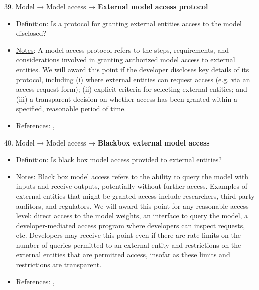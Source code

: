 39. Model → Model access → \textbf{External model access protocol}
\vspace{-\parskip}
\begin{itemize}
	\item
	\underline{Definition}: Is a protocol for granting external entities access to the model disclosed?
	\item
	\underline{Notes}: A model access protocol refers to the steps, requirements, and considerations involved in granting authorized model access to external entities. We will award this point if the developer discloses key details of its protocol, including (i) where external entities can request access (e.g. via an access request form); (ii) explicit criteria for selecting external entities; and (iii) a transparent decision on whether access has been granted within a specified, reasonable period of time.
	\item
	\underline{References}: \citet{solaiman2023gradient}, \citet{shevlane2022structured}
\end{itemize} \vspace{\baselineskip}


40. Model → Model access → \textbf{Blackbox external model access}
\vspace{-\parskip}
\begin{itemize}
	\item
	\underline{Definition}: Is black box model access provided to external entities?
	\item
	\underline{Notes}: Black box model access refers to the ability to query the model with inputs and receive outputs, potentially without further access. Examples of external entities that might be granted access include researchers, third-party auditors, and regulators. We will award this point for any reasonable access level: direct access to the model weights, an interface to query the model, a developer-mediated access program where developers can inspect requests, etc. Developers may receive this point even if there are rate-limits on the number of queries permitted to an external entity and restrictions on the external entities that are permitted access, insofar as these limits and restrictions are transparent.
	\item
	\underline{References}: \citet{solaiman2023gradient}, \citet{shevlane2022structured}
\end{itemize} \vspace{\baselineskip}



